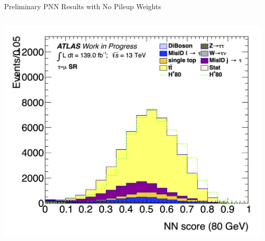 \documentclass[aspectratio=169,xcolor=table]{beamer}
\begin{document}
\begin{frame}{Preliminary PNN Results with No Pileup Weights}
\begin{columns}
        \includegraphics[height=.24\textheight,keepaspectratio=true]{Scores/taulep/myOutDirClfEval_1p_noUpsilon_test_full/clf_score_GB200_mass_80to80_SR_TAUMU.png}


\end{columns}
\end{frame}
\end{document}
